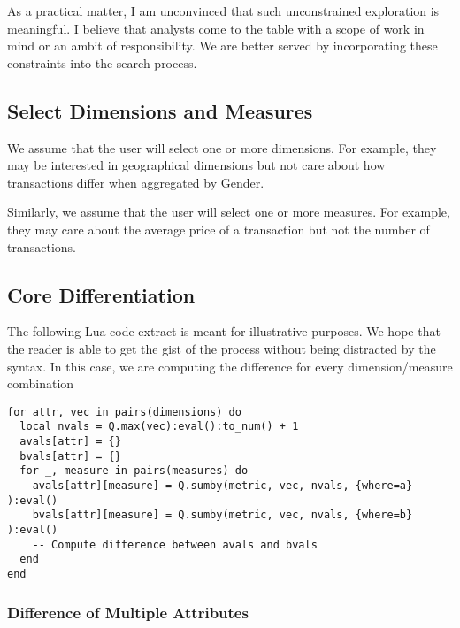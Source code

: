 As a practical matter, I am unconvinced that such unconstrained exploration is
meaningful. I believe that analysts come to the table with a scope of work in
mind or an ambit of responsibility. We are better served by incorporating these
constraints into the search process.



\subsection{Select Dimensions and Measures}
\label{DimsAndMeasures}

We assume that the user will select one or more dimensions. For example, they
may be interested in geographical dimensions but not care about how transactions
differ when aggregated by Gender. 

Similarly, we assume that the user will select one or more measures. For
example, they may care about the average
price of a transaction but not the number of transactions.

\subsection{Core Differentiation}
\label{Differentiation}

The following Lua code extract is meant for illustrative purposes. We hope that
the reader is able to get the gist of the process without being distracted by
the syntax. In this case, we are computing the difference for every
dimension/measure combination
\begin{verbatim}
for attr, vec in pairs(dimensions) do 
  local nvals = Q.max(vec):eval():to_num() + 1
  avals[attr] = {}
  bvals[attr] = {}
  for _, measure in pairs(measures) do 
    avals[attr][measure] = Q.sumby(metric, vec, nvals, {where=a} ):eval()
    bvals[attr][measure] = Q.sumby(metric, vec, nvals, {where=b} ):eval()
    -- Compute difference between avals and bvals
  end
end
\end{verbatim}
%

\subsubsection{Difference of Multiple Attributes}


